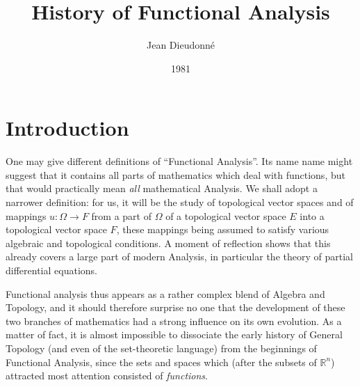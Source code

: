 \documentclass[12pt,a4paper,leqno,twoside]{extbook}
\title{History of Functional Analysis}
\author{Jean Dieudonné}
\date{1981}
\newcommand{\R}{\mathbb{R}}
\begin{document}
\maketitle

\tableofcontents

\fancyhead[C]{\textsc{\leftmark}} %

\chapter*{Introduction}

One may give different definitions of ``Functional Analysis''. Its name name might suggest that it contains all parts of mathematics which deal with functions, but that would practically mean \emph{all} mathematical Analysis. We shall adopt a narrower definition: for us, it will be the study of topological vector spaces and of mappings \(u: \Omega \to F\) from a part of \(\Omega\) of a topological vector space \(E\) into a topological vector space \(F\), these mappings being assumed to satisfy various algebraic and topological conditions. A moment of reflection shows that this already covers a large part of modern Analysis, in particular the theory of partial differential equations.

Functional analysis thus appears as a rather complex blend of Algebra and Topology, and it should therefore surprise no one that the development of these two branches of mathematics had a strong influence on its own evolution. As a matter of fact, it is almost impossible to dissociate the early history of General Topology (and even of the set-theoretic language) from the beginnings of Functional Analysis, since the sets and spaces which (after the subsets of \(\R^n\)) attracted most attention consisted of \emph{functions}.
\end{document}
